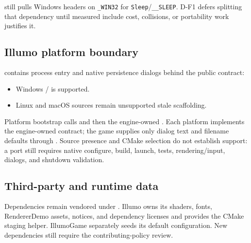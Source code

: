 \begin{statusbox}
 still pulls Windows headers on \texttt{\_WIN32} for
\texttt{Sleep}/\texttt{\_\_SLEEP}. D-F1 defers splitting that dependency until
measured include cost, collisions, or portability work justifies it.
\end{statusbox}

\subsection{Illumo platform boundary}
 contains process entry and native persistence
dialogs behind the public  contract:
\begin{itemize}
  \item Windows / is supported.
  \item Linux and macOS sources remain unsupported stale scaffolding.
\end{itemize}
Platform bootstrap calls  and then the
engine-owned . Each platform implements the
engine-owned  contract; the game supplies only dialog text
and filename defaults through . Source presence
and CMake selection do not establish support: a port still requires native
configure, build, launch, tests, rendering/input, dialogs, and shutdown
validation.

\subsection{Third-party and runtime data}
Dependencies remain vendored under . Illumo owns
its shaders, fonts, RendererDemo assets, notices, and dependency licenses and
provides the CMake staging helper. IllumoGame separately seeds its default
configuration. New dependencies still require the contributing-policy review.
